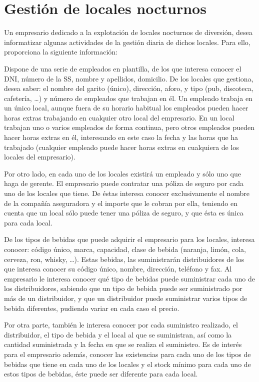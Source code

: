 \documentclass[a4paper]{article}
\begin{document}
\section{Gestión de locales nocturnos}
Un empresario dedicado a la explotación de locales nocturnos de diversión, desea informatizar algunas actividades de la gestión diaria de dichos locales. Para ello, proporciona la siguiente información:

Dispone de una serie de empleados en plantilla, de los que interesa conocer el DNI, número de la SS, nombre y apellidos, domicilio. De los locales que gestiona, desea saber: el nombre del garito (único), dirección, aforo, y tipo (pub, discoteca, cafetería, \ldots) y número de empleados que trabajan en él. Un empleado trabaja en un único local, aunque fuera de su horario habitual los empleados pueden hacer horas extras trabajando en cualquier otro local del empresario. En un local trabajan uno o varios empleados de forma continua, pero otros empleados pueden hacer horas extras en él, interesando en este caso la fecha y las horas que ha trabajado (cualquier empleado puede hacer horas extras en cualquiera de los locales del empresario). 

Por otro lado, en cada uno de los locales existirá un empleado y sólo uno que haga de gerente. El empresario puede contratar una póliza de seguro por cada uno de los locales que tiene. De éstas interesa conocer exclusivamente el nombre de la compañía aseguradora y el importe que le cobran por ella, teniendo en cuenta que un local sólo puede tener una póliza de seguro, y que ésta es única para cada local.

De los tipos de bebidas que puede adquirir el empresario para los locales, interesa conocer: código único, marca, capacidad, clase de bebida (naranja, limón, cola, cerveza, ron, whisky, \ldots). Estas bebidas, las suministrarán distribuidores de los que interesa conocer su código único, nombre, dirección, teléfono y fax. Al empresario le interesa conocer qué tipo de bebidas puede suministrar cada uno de los distribuidores, sabiendo que un tipo de bebida puede ser suministrado por más de un distribuidor, y que un distribuidor puede suministrar varios tipos de bebida diferentes, pudiendo variar en cada caso el precio.

Por otra parte, también le interesa conocer por cada suministro realizado, el distribuidor, el tipo de bebida y el local al que se suministran, así como la cantidad suministrada y la fecha en que se realiza el suministro. Es de interés para el empresario además, conocer las existencias para cada uno de los tipos de bebidas que tiene en cada uno de los locales y el stock mínimo para cada uno de estos tipos de bebidas, éste puede ser diferente para cada local.
\end{document}
